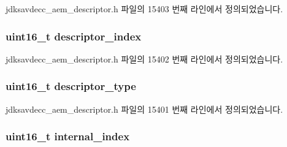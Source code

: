 jdksavdecc\+\_\+aem\+\_\+descriptor.\+h 파일의 15403 번째 라인에서 정의되었습니다.

\subsubsection[{\texorpdfstring{descriptor\+\_\+index}{descriptor_index}}]{\setlength{\rightskip}{0pt plus 5cm}uint16\+\_\+t descriptor\+\_\+index}\hypertarget{structjdksavdecc__descriptor__internal__port_a042bbc76d835b82d27c1932431ee38d4}{}\label{structjdksavdecc__descriptor__internal__port_a042bbc76d835b82d27c1932431ee38d4}


jdksavdecc\+\_\+aem\+\_\+descriptor.\+h 파일의 15402 번째 라인에서 정의되었습니다.

\subsubsection[{\texorpdfstring{descriptor\+\_\+type}{descriptor_type}}]{\setlength{\rightskip}{0pt plus 5cm}uint16\+\_\+t descriptor\+\_\+type}\hypertarget{structjdksavdecc__descriptor__internal__port_ab7c32b6c7131c13d4ea3b7ee2f09b78d}{}\label{structjdksavdecc__descriptor__internal__port_ab7c32b6c7131c13d4ea3b7ee2f09b78d}


jdksavdecc\+\_\+aem\+\_\+descriptor.\+h 파일의 15401 번째 라인에서 정의되었습니다.

\subsubsection[{\texorpdfstring{internal\+\_\+index}{internal_index}}]{\setlength{\rightskip}{0pt plus 5cm}uint16\+\_\+t internal\+\_\+index}\hypertarget{structjdksavdecc__descriptor__internal__port_a56a4632be255e3d3028e9978461c8ff4}{}\label{structjdksavdecc__descriptor__internal__port_a56a4632be255e3d3028e9978461c8ff4}


